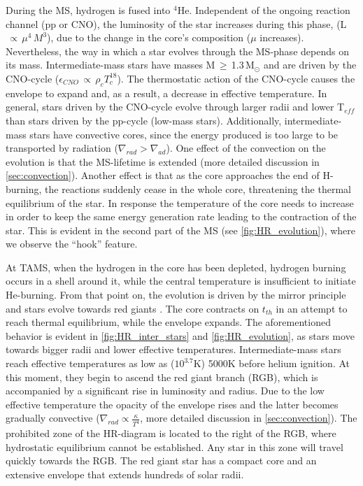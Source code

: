 During the MS, hydrogen is fused into $^4$He. Independent of the ongoing reaction channel (pp or CNO), the luminosity of the star increases during this phase, (L$\,\propto\,\mu^{4}\,M^3$), due to the change in the core's composition ($\mu$ increases). Nevertheless, the way in which a star evolves through the MS-phase depends on its mass. Intermediate-mass stars have masses M\,$\geq$\,1.3\,M$_\odot$ and are driven by the CNO-cycle ($\epsilon_{CNO}\,\propto\,\rho_{c}T^{18}_{c}$). The thermostatic action of the CNO-cycle causes the envelope to expand and, as a result, a decrease in effective temperature. In general, stars driven by the CNO-cycle evolve through larger radii and lower T$_{eff}$ than stars driven by the pp-cycle (low-mass stars). Additionally, intermediate-mass stars have convective cores, since the energy produced is too large to be transported by radiation ($\nabla_{rad} > \nabla_{ad}$). One effect of the convection on the evolution is that the MS-lifetime is extended (more detailed discussion in \cref{sec:convection}). Another effect is that as the core approaches the end of H-burning, the reactions suddenly cease in the whole core, threatening the thermal equilibrium of the star. In response the temperature of the core needs to increase in order to keep the same energy generation rate leading to the contraction of the star. This is evident in the second part of the MS (see \cref{fig:HR_evolution}), where we observe the ``hook'' feature. 

At TAMS, when the hydrogen in the core has been depleted, hydrogen burning occurs in a shell around it, while the central temperature is insufficient to initiate He-burning. From that point on, the evolution is driven by the mirror principle and stars evolve towards red giants \citep{pols2011stellar}. The core contracts on $t_{th}$ in an attempt to reach thermal equilibrium, while the envelope expands. The aforementioned behavior is evident in \cref{fig:HR_inter_stars} and \cref{fig:HR_evolution}, as stars move towards bigger radii and lower effective temperatures. Intermediate-mass stars reach effective temperatures as low as ($10^{3.7}$K) 5000K before helium ignition. At this moment, they begin to ascend the red giant branch (RGB), which is accompanied by a significant rise in luminosity and radius. Due to the low effective temperature the opacity of the envelope rises and the latter becomes gradually convective ($\nabla_{rad} \propto \frac{\kappa}{T^4}$, more detailed discussion in \cref{sec:convection}). The prohibited zone of the HR-diagram is located to the right of the RGB, where hydrostatic equilibrium cannot be established. Any star in this zone will travel quickly towards the RGB. The red giant star has a compact core and an extensive envelope that extends hundreds of solar radii. 

